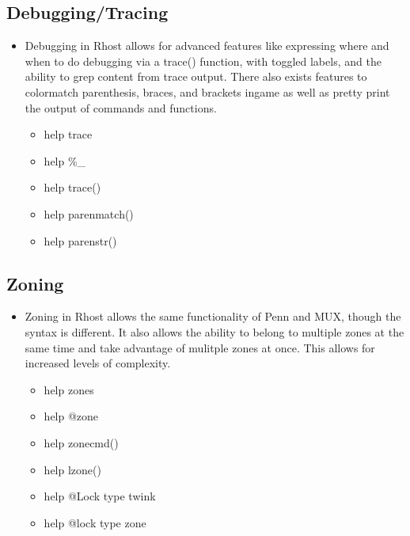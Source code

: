 \documentclass[letterpaper,10pt,english]{sphinxmanual}
\begin{document}
\subsection{Debugging/Tracing}
\label{\detokenize{features:debugging-tracing}}\begin{itemize}
\item {} 
\sphinxAtStartPar
Debugging in Rhost allows for advanced features like expressing where and
when to do debugging via a trace() function, with toggled labels, and the
ability to grep content from trace output.  There also exists features to
color\sphinxhyphen{}match parenthesis, braces, and brackets in\sphinxhyphen{}game as well as pretty print
the output of commands and functions.
\begin{itemize}
\item {} 
\sphinxAtStartPar
help trace

\item {} 
\sphinxAtStartPar
help \%\_

\item {} 
\sphinxAtStartPar
help trace()

\item {} 
\sphinxAtStartPar
help parenmatch()

\item {} 
\sphinxAtStartPar
help parenstr()

\end{itemize}

\end{itemize}


\subsection{Zoning}
\label{\detokenize{features:zoning}}\begin{itemize}
\item {} 
\sphinxAtStartPar
Zoning in Rhost allows the same functionality of Penn and MUX, though the
syntax is different.  It also allows the ability to belong to multiple
zones at the same time and take advantage of mulitple zones at once.
This allows for increased levels of complexity.
\begin{itemize}
\item {} 
\sphinxAtStartPar
help zones

\item {} 
\sphinxAtStartPar
help @zone

\item {} 
\sphinxAtStartPar
help zonecmd()

\item {} 
\sphinxAtStartPar
help lzone()

\item {} 
\sphinxAtStartPar
help @Lock type twink

\item {} 
\sphinxAtStartPar
help @lock type zone

\end{itemize}

\end{itemize}
\end{document}
